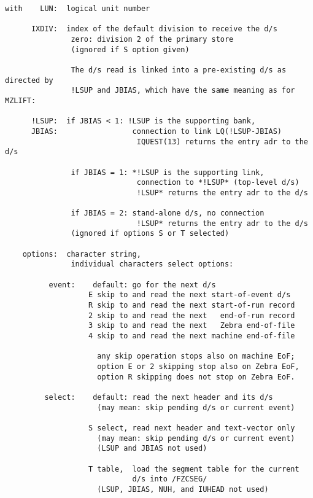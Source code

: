 \begin{verbatim}
with    LUN:  logical unit number

      IXDIV:  index of the default division to receive the d/s
               zero: division 2 of the primary store
               (ignored if S option given)

               The d/s read is linked into a pre-existing d/s as directed by
               !LSUP and JBIAS, which have the same meaning as for MZLIFT:

      !LSUP:  if JBIAS < 1: !LSUP is the supporting bank,
      JBIAS:                 connection to link LQ(!LSUP-JBIAS)
                              IQUEST(13) returns the entry adr to the d/s

               if JBIAS = 1: *!LSUP is the supporting link,
                              connection to *!LSUP* (top-level d/s)
                              !LSUP* returns the entry adr to the d/s

               if JBIAS = 2: stand-alone d/s, no connection
                              !LSUP* returns the entry adr to the d/s
               (ignored if options S or T selected)

    options:  character string,
               individual characters select options:

          event:    default: go for the next d/s
                   E skip to and read the next start-of-event d/s
                   R skip to and read the next start-of-run record
                   2 skip to and read the next   end-of-run record
                   3 skip to and read the next   Zebra end-of-file
                   4 skip to and read the next machine end-of-file

                     any skip operation stops also on machine EoF;
                     option E or 2 skipping stop also on Zebra EoF,
                     option R skipping does not stop on Zebra EoF.

         select:    default: read the next header and its d/s
                     (may mean: skip pending d/s or current event)

                   S select, read next header and text-vector only
                     (may mean: skip pending d/s or current event)
                     (LSUP and JBIAS not used)

                   T table,  load the segment table for the current
                             d/s into /FZCSEG/
                     (LSUP, JBIAS, NUH, and IUHEAD not used)


\end{verbatim}
